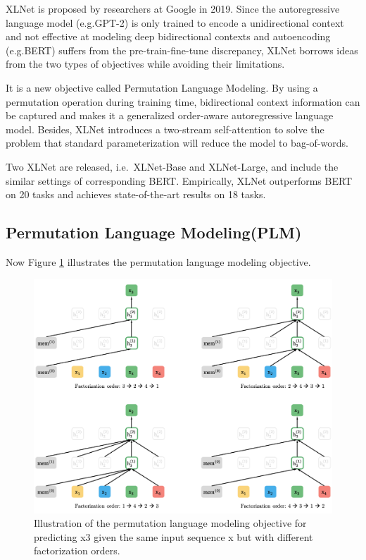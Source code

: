 \documentclass[]{krantz}
\begin{document}
XLNet is proposed by researchers at Google in 2019. Since the autoregressive language model (e.g.GPT-2) is only trained to encode a unidirectional context and not effective at modeling deep bidirectional contexts and autoencoding (e.g.BERT) suffers from the pre-train-fine-tune discrepancy, XLNet borrows ideas from the two types of objectives while avoiding their limitations.

It is a new objective called Permutation Language Modeling. By using a permutation operation during training time, bidirectional context information can be captured and makes it a generalized order-aware autoregressive language model. Besides, XLNet introduces a two-stream self-attention to solve the problem that standard parameterization will reduce the model to bag-of-words.

Two XLNet are released, i.e.~XLNet-Base and XLNet-Large, and include the similar settings of corresponding BERT. Empirically, XLNet outperforms BERT on 20 tasks and achieves state-of-the-art results on 18 tasks.

\hypertarget{permutation-language-modelingplm}{%
\subsection{Permutation Language Modeling(PLM)}\label{permutation-language-modelingplm}}

Now Figure \ref{fig:ch02-03-figure010} illustrates the permutation language modeling objective.

\begin{figure}

{\centering \includegraphics[width=0.7\linewidth]{figures/02-03-transfer-learning-for-nlp/xlnet_pml} 

}

\caption{Illustration of the permutation language modeling objective for predicting x3 given the same input sequence x but with different factorization orders.}\label{fig:ch02-03-figure010}
\end{figure}
\end{document}
